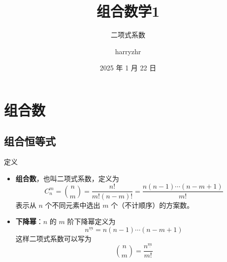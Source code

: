 \documentclass[UTF8]{beamer}
\title{组合数学1}
\subtitle{二项式系数}
\author{harryzhr}
\date{2025 年 1 月 22 日}
\begin{document}
    \maketitle
    \section{组合数}
    \subsection{组合恒等式}
    \begin{frame}{定义}
        \begin{itemize}
            \item \textbf{组合数}，也叫二项式系数，定义为
            $$
            C_{n}^{m}=\binom{n}{m}=\frac{n!}{m!(n-m)!}=\frac{n(n-1)\cdots(n-m+1)}{m!}
            $$
            表示从 $n$ 个不同元素中选出 $m$ 个（不计顺序）的方案数。
            \item \textbf{下降幂}：$n$ 的 $m$ 阶下降幂定义为
            $$
            n^{\underline m} = n(n-1)\cdots (n-m+1)
            $$
            这样二项式系数可以写为
            $$
            \binom{n}{m} = \frac{n^{\underline m}}{m!}
            $$
        \end{itemize}
    
    \end{frame}
\end{document}

